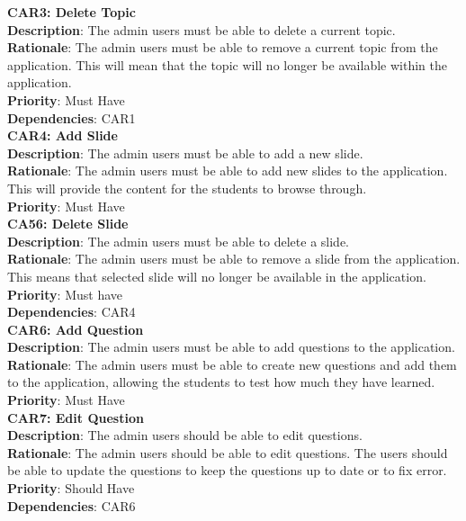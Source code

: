 \documentclass{l3proj}
\begin{document}
\textbf{CAR3: Delete Topic}\\
\textbf{Description}: The admin users must be able to delete a current topic. \\
\textbf{Rationale}: The admin users must be able to remove a current topic from the application. This will mean that the topic will no longer be available within the application.\\
\textbf{Priority}: Must Have \\
\textbf{Dependencies}: CAR1\\

\textbf{CAR4: Add Slide}\\
\textbf{Description}:  The admin users must be able to add a new slide. \\
\textbf{Rationale}: The admin users must be able to add new slides to the application. This will provide the content for the students to browse through. \\
\textbf{Priority}: Must Have\\

\textbf{CA56: Delete Slide}\\
\textbf{Description}: The admin users must be able to delete a slide.\\ 
\textbf{Rationale}: The admin users must be able to remove a slide from the application. This means that selected slide will no longer be available in the application.\\
\textbf{Priority}: Must have\\
\textbf{Dependencies}: CAR4\\

\textbf{CAR6: Add Question}\\
\textbf{Description}: The admin users must be able to add questions to the application. \\
\textbf{Rationale}: The admin users must be able to create new questions and add them to the application, allowing the students to test how much they have learned.\\
\textbf{Priority}: Must Have\\

\textbf{CAR7: Edit Question}\\
\textbf{Description}: The admin users should be able to edit questions.\\
\textbf{Rationale}: The admin users should be able to edit questions. The users should be able to update the questions to keep the questions up to date or to fix error.\\
\textbf{Priority}: Should Have \\
\textbf{Dependencies}: CAR6\\
\end{document}

